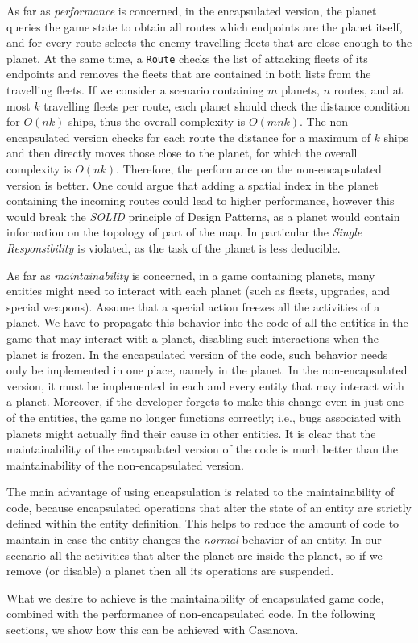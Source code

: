 As far as \emph{performance} is concerned, in the encapsulated version, the planet queries the game state to obtain all routes which endpoints are the planet itself, and for every route selects the enemy travelling fleets that are close enough to the planet. At the same time, a \texttt{Route} checks the list of attacking fleets of its endpoints and removes the fleets that are contained in both lists from the travelling fleets. If we consider a scenario containing $m$ planets, $n$ routes, and at most $k$ travelling fleets per route, each planet should check the distance condition for $O(nk)$ ships, thus the overall complexity is $O(mnk)$. The non-encapsulated version checks for each route the distance for a maximum of $k$ ships and then directly moves those close to the planet, for which the overall complexity is $O(nk)$. Therefore, the performance on the non-encapsulated version is better. One could argue that adding a spatial index in the planet containing the incoming routes could lead to higher performance, however this would break the \textit{SOLID} principle of Design Patterns, as a planet would contain information on the topology of part of the map. In particular the \textit{Single Responsibility} is violated, as the task of the planet is less deducible.

As far as \emph{maintainability} is concerned, in a game containing planets, many entities might need to interact with each planet (such as fleets, upgrades, and special weapons). Assume that a special action freezes all the activities of a planet. We have to propagate this behavior into the code of all the entities in the game that may interact with a planet, disabling such interactions when the planet is frozen. In the encapsulated version of the code, such behavior needs only be implemented in one place, namely in the planet. In the non-encapsulated version, it must be implemented in each and every entity that may interact with a planet. Moreover, if the developer forgets to make this change even in just one of the entities, the game no longer functions correctly; i.e., bugs associated with planets might actually find their cause in other entities. It is clear that the maintainability of the encapsulated version of the code is much better than the maintainability of the non-encapsulated version.

The main advantage of using encapsulation is related to the maintainability of code, because encapsulated operations that alter the state of an entity are strictly defined within the entity definition. This helps to reduce the amount of code to maintain in case the entity changes the \textit{normal} behavior of an entity. In our scenario all the activities that alter the planet are inside the planet, so if we remove (or disable) a planet then all its operations are suspended.

What we desire to achieve is the maintainability of encapsulated game code, combined with the performance of non-encapsulated code. In the following sections, we show how this can be achieved with Casanova. 